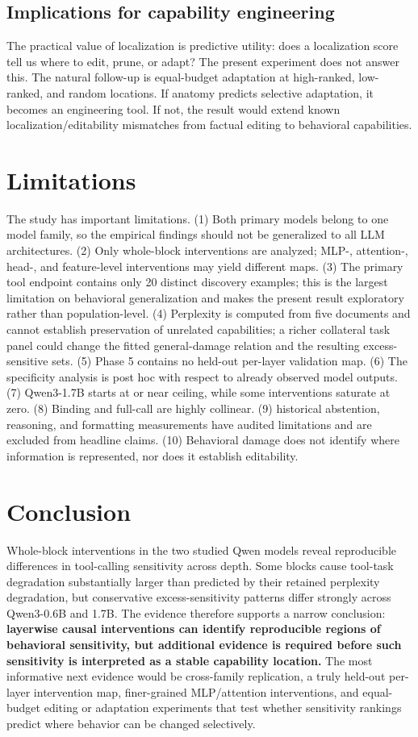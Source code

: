 \documentclass[10pt,twocolumn]{article}
\begin{document}
\subsection{Implications for capability engineering}
The practical value of localization is predictive utility: does a localization score tell us where to edit, prune, or adapt? The present experiment does not answer this. The natural follow-up is equal-budget adaptation at high-ranked, low-ranked, and random locations. If anatomy predicts selective adaptation, it becomes an engineering tool. If not, the result would extend known localization/editability mismatches from factual editing to behavioral capabilities.

\section{Limitations}
The study has important limitations. (1) Both primary models belong to one model family, so the empirical findings should not be generalized to all LLM architectures. (2) Only whole-block interventions are analyzed; MLP-, attention-, head-, and feature-level interventions may yield different maps. (3) The primary tool endpoint contains only 20 distinct discovery examples; this is the largest limitation on behavioral generalization and makes the present result exploratory rather than population-level. (4) Perplexity is computed from five documents and cannot establish preservation of unrelated capabilities; a richer collateral task panel could change the fitted general-damage relation and the resulting excess-sensitive sets. (5) Phase 5 contains no held-out per-layer validation map. (6) The specificity analysis is post hoc with respect to already observed model outputs. (7) Qwen3-1.7B starts at or near ceiling, while some interventions saturate at zero. (8) Binding and full-call are highly collinear. (9) historical abstention, reasoning, and formatting measurements have audited limitations and are excluded from headline claims. (10) Behavioral damage does not identify where information is represented, nor does it establish editability.

\section{Conclusion}
Whole-block interventions in the two studied Qwen models reveal reproducible differences in tool-calling sensitivity across depth. Some blocks cause tool-task degradation substantially larger than predicted by their retained perplexity degradation, but conservative excess-sensitivity patterns differ strongly across Qwen3-0.6B and 1.7B. The evidence therefore supports a narrow conclusion: \textbf{layerwise causal interventions can identify reproducible regions of behavioral sensitivity, but additional evidence is required before such sensitivity is interpreted as a stable capability location.} The most informative next evidence would be cross-family replication, a truly held-out per-layer intervention map, finer-grained MLP/attention interventions, and equal-budget editing or adaptation experiments that test whether sensitivity rankings predict where behavior can be changed selectively.
\end{document}
